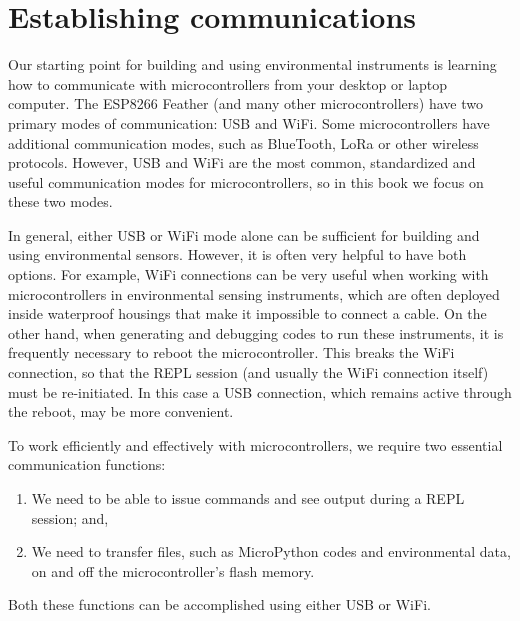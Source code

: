 
%

\section{Establishing communications}

Our starting point for building and using environmental instruments is learning how to communicate with microcontrollers from your desktop or laptop computer. 
The ESP8266 Feather (and many other microcontrollers) have two primary modes of communication: USB and WiFi. 
Some microcontrollers have additional communication modes, such as BlueTooth, LoRa or other wireless protocols.
However, USB and WiFi are the most common, standardized and useful communication modes for microcontrollers, so in this book we focus on these two modes. 

In general, either USB or WiFi mode alone can be sufficient for building and using environmental sensors.
However, it is often very helpful to have both options. 
For example, WiFi connections can be very useful when working with microcontrollers in environmental sensing instruments, which are often deployed inside waterproof housings that make it impossible to connect a cable. 
On the other hand, when generating and debugging codes to run these instruments, it is frequently necessary to reboot the microcontroller. 
This breaks the WiFi connection, so that the REPL session (and usually the WiFi connection itself) must be re-initiated. 
In this case a USB connection, which remains active through the reboot, may be more convenient.

To work efficiently and effectively with microcontrollers, we require two essential communication functions: 
\begin{enumerate}
	\item We need to be able to issue commands and see output during a REPL session; and, 
	\item We need to transfer files, such as MicroPython codes and environmental data, on and off the microcontroller's flash memory.
\end{enumerate} 
Both these functions can be accomplished using either USB or WiFi. 


